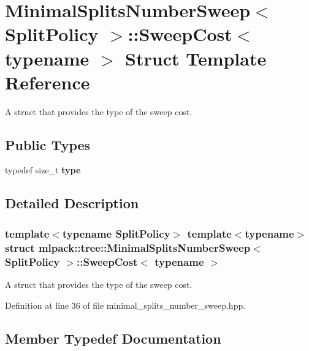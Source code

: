 \section{Minimal\+Splits\+Number\+Sweep$<$ Split\+Policy $>$\+:\+:Sweep\+Cost$<$ typename $>$ Struct Template Reference}
\label{structmlpack_1_1tree_1_1MinimalSplitsNumberSweep_1_1SweepCost}


A struct that provides the type of the sweep cost.  


\subsection*{Public Types}
\begin{DoxyCompactItemize}
\item 
typedef size\+\_\+t \textbf{ type}
\end{DoxyCompactItemize}


\subsection{Detailed Description}
\subsubsection*{template$<$typename Split\+Policy$>$\newline
template$<$typename$>$\newline
struct mlpack\+::tree\+::\+Minimal\+Splits\+Number\+Sweep$<$ Split\+Policy $>$\+::\+Sweep\+Cost$<$ typename $>$}

A struct that provides the type of the sweep cost. 

Definition at line 36 of file minimal\+\_\+splits\+\_\+number\+\_\+sweep.\+hpp.



\subsection{Member Typedef Documentation}
\mbox{\label{structmlpack_1_1tree_1_1MinimalSplitsNumberSweep_1_1SweepCost_a1e546bd1d4fb5c153cbdf2b1bb66171e}} 
